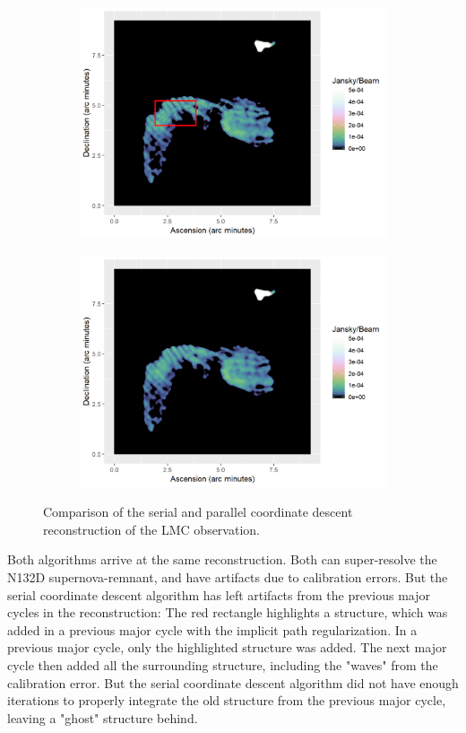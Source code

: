 \begin{figure}[h]
\begin{subfigure}{0.45\linewidth}
		\includegraphics[width=1.0\linewidth]{./chapters/05.pcdm/comparison/SerialCD-Calibration2.png}
	\end{subfigure}
	\begin{subfigure}{0.45\linewidth}
		\centering
		\includegraphics[width=1.0\linewidth]{./chapters/05.pcdm/comparison/PCDM-Calibration.png}
	\end{subfigure}

	\caption{Comparison of the serial and parallel coordinate descent reconstruction of the LMC observation.}
	\label{pcdm:comparison:figure}
\end{figure}

Both algorithms arrive at the same reconstruction. Both can super-resolve the N132D supernova-remnant, and have artifacts due to calibration errors. But the serial coordinate descent algorithm has left artifacts from the previous major cycles in the reconstruction: The red rectangle highlights a structure, which was added in a previous major cycle with the implicit path regularization. In a previous major cycle, only the highlighted structure was added. The next major cycle then added all the surrounding structure, including the "waves" from the calibration error. But the serial coordinate descent algorithm did not have enough iterations to properly integrate the old structure from the previous major cycle, leaving a "ghost" structure behind.

